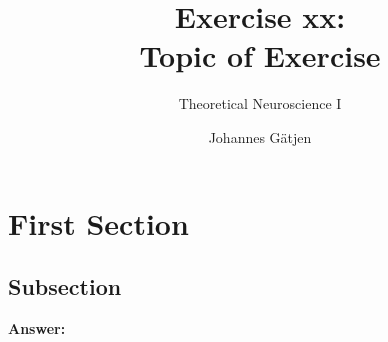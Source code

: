 \documentclass{scrartcl}
\title{Exercise xx:\\Topic of Exercise}
\subtitle{Theoretical Neuroscience I}
\author{Johannes G\"atjen}
\newcommand\Answer{%
  \textbf{Answer:}%
}
\begin{document}
\maketitle
\section{First Section}
\subsection{Subsection}
\Answer\\
\end{document}
